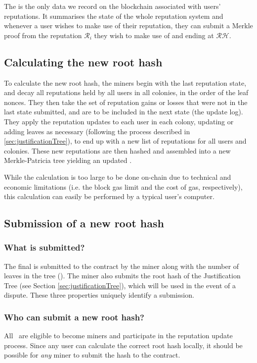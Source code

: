 The  is the only data we record on the blockchain associated with users' reputations. It summarises the state of the whole reputation system and whenever a user wishes to make use of their reputation, they can submit a Merkle proof from the reputation $\mathcal{R}_i$ they wish to make use of and ending at $\mathcal{RH}$.

\subsection{Calculating the new root hash}
To calculate the new root hash, the miners begin with the last reputation state, and decay all reputations held by all users in all colonies, in the order of the leaf nonces. They then take the set of reputation gains or losses that were not in the last state submitted, and are to be included in the next state (the update log). They apply the reputation updates to each user in each colony, updating or adding leaves as necessary (following the process described in \ref{sec:justificationTree}), to end up with a new list of reputations for all users and colonies. These new reputations are then hashed and assembled into a new Merkle-Patricia tree yielding an updated .

While the calculation is too large to be done on-chain due to technical and economic limitations (i.e. the block gas limit and the cost of gas, respectively), this calculation can easily be performed by a typical user's computer.

\subsection{Submission of a new root hash}
%
\subsubsection*{What is submitted?}
The final  is submitted to the contract by the miner along with the number of leaves in the tree (). The miner also submits the root hash of the Justification Tree (see Section \ref{sec:justificationTree}), which will be used in the event of a dispute. These three properties uniquely identify a submission.
%
\subsubsection*{Who can submit a new root hash?}
All \rcths\ are eligible to become miners and participate in the reputation update process. Since any user can calculate the correct root hash locally, it should be possible for \emph{any} miner to submit the hash to the contract.

